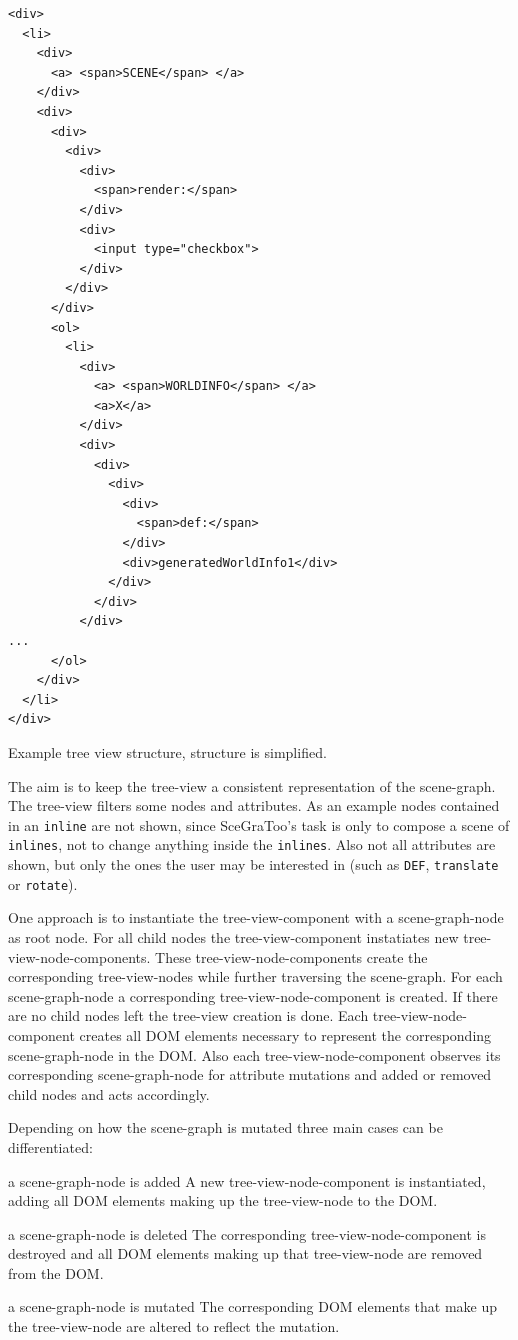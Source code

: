 \begin{listing}
  \begin{verbatim}
<div>
  <li>
    <div>
      <a> <span>SCENE</span> </a>
    </div>
    <div>
      <div>
        <div>
          <div>
            <span>render:</span>
          </div>
          <div>
            <input type="checkbox">
          </div>
        </div>
      </div>
      <ol>
        <li>
          <div>
            <a> <span>WORLDINFO</span> </a>
            <a>X</a>
          </div>
          <div>
            <div>
              <div>
                <div>
                  <span>def:</span>
                </div>
                <div>generatedWorldInfo1</div>
              </div>
            </div>
          </div>
...
      </ol>
    </div>
  </li>
</div>
  \end{verbatim}
  \caption{Example tree view structure, structure is simplified.}
  \label{list:tree-view}
\end{listing}

The aim is to keep the tree-view a consistent representation of the scene-graph.
The tree-view filters some nodes and attributes. As an example nodes contained
in an \texttt{inline} are not shown, since  SceGraToo's task is only to compose
a scene of \texttt{inlines}, not to change anything inside the \texttt{inlines}.
Also not all attributes are shown, but only the ones the user may be interested
in (such as \texttt{DEF}, \texttt{translate} or \texttt{rotate}).

One approach is to instantiate the tree-view-component with a
scene-graph-node as root node. For all child nodes the tree-view-component
instatiates new tree-view-node-components. These tree-view-node-components
create the corresponding tree-view-nodes while further traversing the
scene-graph. For each scene-graph-node a corresponding tree-view-node-component
is created. If there are no child nodes left the tree-view creation is done.
Each tree-view-node-component creates all \gls{DOM} elements necessary to represent
the corresponding scene-graph-node in the \gls{DOM}. Also each
tree-view-node-component observes its corresponding scene-graph-node for
attribute mutations and added or removed child nodes and acts accordingly.

Depending on how the scene-graph is mutated three main cases can be differentiated:

\begin{description*}
  \item[a scene-graph-node is added]
    A new tree-view-node-component is instantiated, adding all \gls{DOM} elements making up the tree-view-node to the \gls{DOM}.
  \item[a scene-graph-node is deleted]
    The corresponding tree-view-node-component is destroyed and all \gls{DOM} elements making up that tree-view-node are removed from the \gls{DOM}.
  \item[a scene-graph-node is mutated]
    The corresponding \gls{DOM} elements that make up the  tree-view-node are altered to reflect the mutation.
\end{description*}

